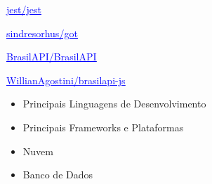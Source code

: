 \documentclass[10pt,a4paper,ragged2e,withhyper]{altacv}
\begin{document}
\begin{paracol}{2}
\href{https://github.com/jestjs/jest/issues?q=commenter%3AWillianAgostini+}{\textcolor{blue}{\underline{jest/jest}}}

\href{https://github.com/sindresorhus/got/issues?q=commenter%3AWillianAgostini+}{\textcolor{blue}{\underline{sindresorhus/got}}}

\href{https://github.com/BrasilAPI/BrasilAPI/issues?q=commenter%3AWillianAgostini+}{\textcolor{blue}{\underline{BrasilAPI/BrasilAPI}}}

\href{https://github.com/WillianAgostini/brasilapi-js}{\textcolor{blue}{\underline{WillianAgostini/brasilapi-js}}}



\switchcolumn




\begin{itemize}
\item{Principais Linguagens de Desenvolvimento}
\end{itemize}


\divider\smallskip

\begin{itemize}
\item{Principais Frameworks e Plataformas}
\end{itemize}

\divider\smallskip

\begin{itemize}
\item{Nuvem}
\end{itemize}

\divider\smallskip

\begin{itemize}
\item{Banco de Dados}
\end{itemize}

\divider\smallskip


\end{paracol}
\end{document}
